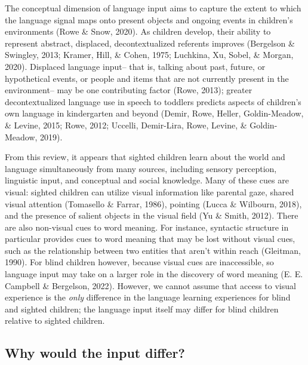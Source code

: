 \documentclass[
  man,floatsintext]{apa6}
\begin{document}
The conceptual dimension of language input aims to capture the extent to which the language signal maps onto present objects and ongoing events in children's environments (Rowe \& Snow, 2020). As children develop, their ability to represent abstract, displaced, decontextualized referents improves (Bergelson \& Swingley, 2013; Kramer, Hill, \& Cohen, 1975; Luchkina, Xu, Sobel, \& Morgan, 2020). Displaced language input-- that is, talking about past, future, or hypothetical events, or people and items that are not currently present in the environment-- may be one contributing factor (Rowe, 2013); greater decontextualized language use in speech to toddlers predicts aspects of children's own language in kindergarten and beyond (Demir, Rowe, Heller, Goldin-Meadow, \& Levine, 2015; Rowe, 2012; Uccelli, Demir-Lira, Rowe, Levine, \& Goldin-Meadow, 2019).

From this review, it appears that sighted children learn about the world and language simultaneously from many sources, including sensory perception, linguistic input, and conceptual and social knowledge. Many of these cues are visual: sighted children can utilize visual information like parental gaze, shared visual attention (Tomasello \& Farrar, 1986), pointing (Lucca \& Wilbourn, 2018), and the presence of salient objects in the visual field (Yu \& Smith, 2012). There are also non-visual cues to word meaning. For instance, syntactic structure in particular provides cues to word meaning that may be lost without visual cues, such as the relationship between two entities that aren't within reach (Gleitman, 1990). For blind children however, because visual cues are inaccessible, so language input may take on a larger role in the discovery of word meaning (E. E. Campbell \& Bergelson, 2022). However, we cannot assume that access to visual experience is the \emph{only} difference in the language learning experiences for blind and sighted children; the language input itself may differ for blind children relative to sighted children.

\hypertarget{why-would-the-input-differ}{%
\subsection{Why would the input differ?}\label{why-would-the-input-differ}}
\end{document}
